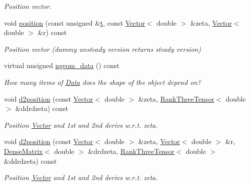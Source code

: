 \begin{DoxyCompactItemize}
\begin{DoxyCompactList}\small\item\em Position vector. \end{DoxyCompactList}\item 
void \hyperlink{classoomph_1_1EllipticalTube_a01c6372a901d28892cab9e43ba8b3530}{position} (const unsigned \&\hyperlink{cfortran_8h_af6f0bd3dc13317f895c91323c25c2b8f}{t}, const \hyperlink{classoomph_1_1Vector}{Vector}$<$ double $>$ \&zeta, \hyperlink{classoomph_1_1Vector}{Vector}$<$ double $>$ \&r) const
\begin{DoxyCompactList}\small\item\em Position vector (dummy unsteady version returns steady version) \end{DoxyCompactList}\item 
virtual unsigned \hyperlink{classoomph_1_1EllipticalTube_ad137810aac62250463273656db192ed7}{ngeom\+\_\+data} () const
\begin{DoxyCompactList}\small\item\em How many items of \hyperlink{classoomph_1_1Data}{Data} does the shape of the object depend on? \end{DoxyCompactList}\item 
void \hyperlink{classoomph_1_1EllipticalTube_a8b64fd523511735679b5820c5fb687cf}{d2position} (const \hyperlink{classoomph_1_1Vector}{Vector}$<$ double $>$ \&zeta, \hyperlink{classoomph_1_1RankThreeTensor}{Rank\+Three\+Tensor}$<$ double $>$ \&ddrdzeta) const
\begin{DoxyCompactList}\small\item\em Position \hyperlink{classoomph_1_1Vector}{Vector} and 1st and 2nd derivs w.\+r.\+t. zeta. \end{DoxyCompactList}\item 
void \hyperlink{classoomph_1_1EllipticalTube_a2fe694a504750371d3ef98a20b92e6a5}{d2position} (const \hyperlink{classoomph_1_1Vector}{Vector}$<$ double $>$ \&zeta, \hyperlink{classoomph_1_1Vector}{Vector}$<$ double $>$ \&r, \hyperlink{classoomph_1_1DenseMatrix}{Dense\+Matrix}$<$ double $>$ \&drdzeta, \hyperlink{classoomph_1_1RankThreeTensor}{Rank\+Three\+Tensor}$<$ double $>$ \&ddrdzeta) const
\begin{DoxyCompactList}\small\item\em Position \hyperlink{classoomph_1_1Vector}{Vector} and 1st and 2nd derivs w.\+r.\+t. zeta. \end{DoxyCompactList}\end{DoxyCompactItemize}
